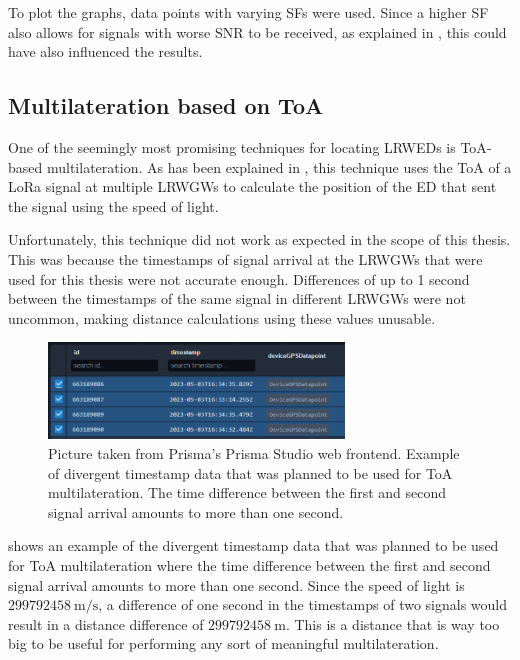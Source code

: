 To plot the graphs, data points with varying \acp{SF} were used.
Since a higher \ac{SF} also allows for signals with worse \ac{SNR} to be received, as explained in , this could have also influenced the results.

\subsection{Multilateration based on \acl{ToA}}\label{subsec:toa-based-multilateration-implementation}

One of the seemingly most promising techniques for locating \aclp{LRWED} is \ac{ToA}-based multilateration.
As has been explained in , this technique uses the \acl{ToA} of a \ac{LoRa} signal at multiple \aclp{LRWGW} to calculate the position of the \acl{ED} that sent the signal using the speed of light.

Unfortunately, this technique did not work as expected in the scope of this thesis.
This was because the timestamps of signal arrival at the \aclp{LRWGW} that were used for this thesis were not accurate enough.
Differences of up to 1 second between the timestamps of the same signal in different \aclp{LRWGW} were not uncommon, making distance calculations using these values unusable.

\begin{figure}[htbp]
    \centering
    \includegraphics[width=0.7\textwidth]{pictures/multilateration/toa_bad_data_example_prisma_studio.png}
    \caption[Example of divergent timestamp data that was planned to be used for \acl{ToA} multilateration]{
        Picture taken from Prisma's Prisma Studio web frontend.
        Example of divergent timestamp data that was planned to be used for \ac{ToA} multilateration.
        The time difference between the first and second signal arrival amounts to more than one second.
    }\label{fig:toa-bad-data-example}
\end{figure}

 shows an example of the divergent timestamp data that was planned to be used for \ac{ToA} multilateration where the time difference between the first and second signal arrival amounts to more than one second.
Since the speed of light is $299792458\ \mathrm{m/s}$, a difference of one second in the timestamps of two signals would result in a distance difference of $299792458\ \mathrm{m}$.
This is a distance that is way too big to be useful for performing any sort of meaningful multilateration.

